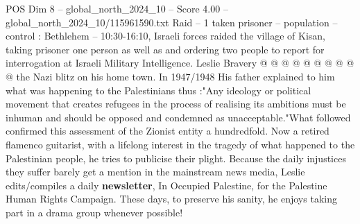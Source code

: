 \begin{textsample}{POS Dim 8 – global\_north\_2024\_10 – Score 4.00 – global\_north\_2024\_10/115961590.txt}
Raid -- 1 taken prisoner -- population -- control : Bethlehem -- 10:30-16:10, Israeli forces raided the village of Kisan, taking prisoner one person as well as and ordering two people to report for interrogation at Israeli Military Intelligence.
Leslie Bravery @ @ @ @ @ @ @ @ @ @ the Nazi blitz on his home town.
In 1947/1948 His father explained to him what was happening to the Palestinians thus :"Any ideology or political movement that creates refugees in the process of realising its ambitions must be inhuman and should be opposed and condemned as unacceptable."What followed confirmed this assessment of the Zionist entity a hundredfold.
Now a retired flamenco guitarist, with a lifelong interest in the tragedy of what happened to the Palestinian people, he tries to publicise their plight.
Because the daily injustices they suffer barely get a mention in the mainstream news media, Leslie edits/compiles a daily \textbf{newsletter}, In Occupied Palestine, for the Palestine Human Rights Campaign.
These days, to preserve his sanity, he enjoys taking part in a drama group whenever possible!

\end{textsample}
